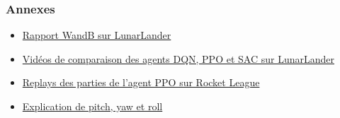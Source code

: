 \documentclass{beamer}
\begin{document}
\appendix
\begin{frame}
    \frametitle{Annexes}
    \begin{itemize}
        \item \href{https://wandb.ai/master-is-heg/rl-lunarlander-eval/reports/Rapport-de-RL-sur-Lunar-Lander--VmlldzoxNjg0MTQxNw}{Rapport WandB sur LunarLander}
        \item \href{https://youtu.be/ah2MeKAFLnw}{Vidéos de comparaison des agents DQN, PPO et SAC sur LunarLander}
        \item \href{https://ballchasing.com/group/beep-boop-v2-10b-tdfuhcyooj}{Replays des parties de l'agent PPO sur Rocket League}
        \item \href{https://simple.wikipedia.org/wiki/Pitch,_yaw,_and_roll}{Explication de pitch, yaw et roll}
    \end{itemize}
\end{frame}
\end{document}
